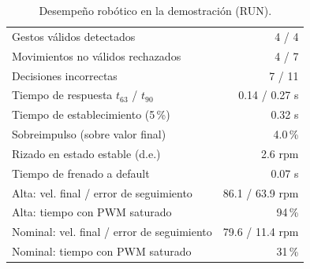 \begin{table}[t]
\centering
\caption{Desempeño robótico en la demostración (RUN).}
\label{tab:robotico}
\scriptsize
\begin{tabular}{lr}
\toprule
Gestos válidos detectados & 4 / 4 \\
Movimientos no válidos rechazados & 4 / 7 \\
Decisiones incorrectas & 7 / 11 \\
Tiempo de respuesta $t_{63}$ / $t_{90}$ & 0.14 / 0.27 s \\
Tiempo de establecimiento (5\,\%) & 0.32 s \\
Sobreimpulso (sobre valor final) & 4.0\,\% \\
Rizado en estado estable (d.e.) & 2.6 rpm \\
Tiempo de frenado a default & 0.07 s \\
Alta: vel. final / error de seguimiento & 86.1 / 63.9 rpm \\
Alta: tiempo con PWM saturado & 94\,\% \\
Nominal: vel. final / error de seguimiento & 79.6 / 11.4 rpm \\
Nominal: tiempo con PWM saturado & 31\,\% \\
\bottomrule
\end{tabular}
\end{table}
